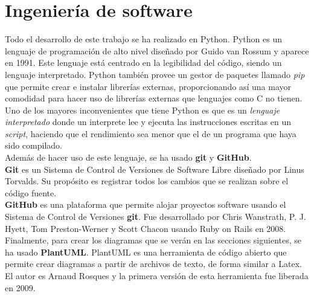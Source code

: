 \chapter{Ingeniería de software}
\label{sec:sftw}
Todo el desarrollo de este trabajo se ha realizado en Python. Python es un lenguaje de programación de alto nivel diseñado por Guido van Rossum y aparece en 1991. Este lenguaje está centrado en la legibilidad del código, siendo un lenguaje interpretado. \linebreak
Python también provee un gestor de paquetes llamado \textit{pip} que permite crear e instalar librerías externas, proporcionando así una mayor comodidad para hacer uso de librerías externas que lenguajes como C no tienen. \\
Uno de los mayores inconvenientes que tiene Python es que es un \textit{lenguaje interpretado} donde un interprete lee y ejecuta las instrucciones escritas en un \textit{script}, haciendo que el rendimiento sea menor que el de un programa que haya sido compilado.\\
\linebreak 
Además de hacer uso de este lenguaje, se ha usado \textbf{git} y \textbf{GitHub}.\\
\textbf{Git} es un Sistema de Control de Versiones de Software Libre diseñado por Linus Torvalds. Su propósito es registrar todos los cambios que se realizan sobre el código fuente.\\
\linebreak
\textbf{GitHub} es una plataforma que permite alojar proyectos software usando el Sistema de Control de Versiones \textbf{git}. Fue desarrollado por Chris Wanstrath, P. J. Hyett, Tom Preston-Werner y Scott Chacon usando Ruby on Rails en 2008.\\
\linebreak
Finalmente, para crear los diagramas que se verán en las secciones siguientes, se ha usado \textbf{PlantUML}. PlantUML es una herramienta de código abierto que permite crear diagramas a partir de archivos de texto, de forma similar a Latex. El autor es Arnaud Rosques y la primera versión de esta herramienta fue liberada en 2009.
\clearpage
